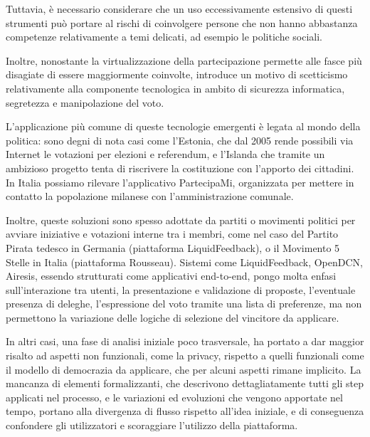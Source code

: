 \documentclass[12pt,a4paper,openright,twoside]{book}
\begin{document}
Tuttavia, è necessario considerare che un uso eccessivamente estensivo di questi strumenti
può portare al rischi di coinvolgere persone che non hanno abbastanza competenze relativamente 
a temi delicati, ad esempio le politiche sociali. 

Inoltre, nonostante la virtualizzazione della partecipazione permette alle fasce più disagiate di essere
maggiormente coinvolte, introduce un motivo di scetticismo relativamente alla componente tecnologica
in ambito di sicurezza informatica, segretezza e manipolazione del voto.

L'applicazione più comune di queste tecnologie emergenti è legata al mondo della politica:
sono degni di nota casi come l'Estonia, che dal 2005 rende possibili via Internet le votazioni
per elezioni e referendum, e l'Islanda che tramite un ambizioso progetto tenta di riscrivere 
la costituzione con l'apporto dei cittadini. In Italia possiamo rilevare l'applicativo PartecipaMi,
organizzata per mettere in contatto la popolazione milanese con l'amministrazione comunale.

Inoltre, queste soluzioni sono spesso adottate da partiti o movimenti politici per avviare iniziative
e votazioni interne tra i membri, come nel caso del Partito Pirata tedesco in Germania (piattaforma LiquidFeedback),
o il Movimento 5 Stelle in Italia (piattaforma Rousseau).
Sistemi come LiquidFeedback, OpenDCN, Airesis, essendo strutturati come applicativi end-to-end,
pongo molta enfasi sull'interazione tra utenti, la presentazione e validazione di proposte,
l'eventuale presenza di deleghe, l'espressione del voto tramite una lista di preferenze, ma
non permettono la variazione delle logiche di selezione del vincitore da applicare\cite{Trapanese:2018}.

In altri casi, una fase di analisi iniziale poco trasversale, ha portato a dar maggior risalto
ad aspetti non funzionali, come la privacy, rispetto a quelli funzionali come il modello di democrazia
da applicare, che per alcuni aspetti rimane implicito. 
La mancanza di elementi formalizzanti, che descrivono dettagliatamente tutti gli step applicati nel
processo, e le variazioni ed evoluzioni che vengono apportate nel tempo, portano alla divergenza di flusso rispetto all'idea iniziale, 
e di conseguenza confondere gli utilizzatori e scoraggiare l'utilizzo della piattaforma\cite{Pianini:2019}.

\end{document}
